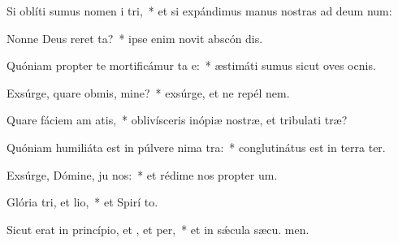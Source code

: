 \item Si oblíti sumus nomen i tri,~* et si expándimus manus nostras ad deum num:
\item Nonne Deus reret ta?~* ipse enim novit abscón dis.
\item Quóniam propter te mortificámur ta e:~* æstimáti sumus sicut oves ocnis.
\item Exsúrge, quare obmis, mine?~* exsúrge, et ne repél  nem.
\item Quare fáciem am atis,~* oblivísceris inópiæ nostræ, et tribulati træ?
\item Quóniam humiliáta est in púlvere nima tra:~* conglutinátus est in terra  ter.
\item Exsúrge, Dómine, ju nos:~* et rédime nos propter  um.
\item Glória tri, et lio,~* et Spirí to.
\item Sicut erat in princípio, et , et per,~* et in sǽcula sæcu. men.
